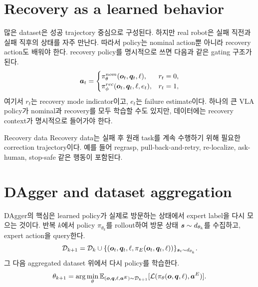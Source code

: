 \section{Recovery as a learned behavior}

많은 dataset은 성공 trajectory 중심으로 구성된다. 하지만 real robot은 실패 직전과 실패 직후의 상태를 자주 만난다. 따라서 policy는 nominal action뿐 아니라 recovery action도 배워야 한다. recovery policy를 명시적으로 쓰면 다음과 같은 gating 구조가 된다.
\begin{equation}
  \bm{a}_t
  =
  \begin{cases}
  \pi^{nom}_{\theta}(\bm{o}_t,\bm{q}_t,\ell), & r_t=0,\\
  \pi^{rec}_{\phi}(\bm{o}_t,\bm{q}_t,\ell,e_t), & r_t=1,
  \end{cases}
  \label{eq:recovery-policy}
\end{equation}
여기서 $r_t$는 recovery mode indicator이고, $e_t$는 failure estimate이다. 하나의 큰 VLA policy가 nominal과 recovery를 모두 학습할 수도 있지만, 데이터에는 recovery context가 명시적으로 들어가야 한다.

\begin{definitionbox}{Recovery data}
Recovery data는 실패 후 원래 task를 계속 수행하기 위해 필요한 correction trajectory이다. 예를 들어 regrasp, pull-back-and-retry, re-localize, ask-human, stop-safe 같은 행동이 포함된다.
\end{definitionbox}

\section{DAgger and dataset aggregation}

DAgger의 핵심은 learned policy가 실제로 방문하는 상태에서 expert label을 다시 모으는 것이다. 반복 $k$에서 policy $\pi_{\theta_k}$를 rollout하여 방문 상태 $\bm{s}\sim d_{\theta_k}$를 수집하고, expert action을 query한다.
\begin{equation}
  \mathcal{D}_{k+1}
  =
  \mathcal{D}_{k}
  \cup
  \{(\bm{o}_t,\bm{q}_t,\ell,\pi_E(\bm{o}_t,\bm{q}_t,\ell))\}_{\bm{s}_t\sim d_{\theta_k}}.
  \label{eq:dagger-update}
\end{equation}
그 다음 aggregated dataset 위에서 다시 policy를 학습한다.
\begin{equation}
  \theta_{k+1}
  =
  \arg\min_{\theta}
  \mathbb{E}_{(\bm{o},\bm{q},\ell,\bm{a}^E)\sim\mathcal{D}_{k+1}}
  [
  \mathcal{L}(\pi_{\theta}(\bm{o},\bm{q},\ell),\bm{a}^E)
  ].
  \label{eq:dagger-training}
\end{equation}

